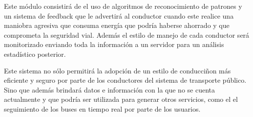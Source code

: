 Este módulo consistirá de el uso de algoritmos de reconocimiento de patrones y un sistema de feedback que le advertirá al conductor cuando este realice una maniobra agresiva que consuma energía que podría haberse ahorrado y que comprometa la seguridad vial. Además el estilo de manejo de cada conductor será monitorizado enviando toda la información a un servidor para un análisis estadístico posterior.

Este sistema no sólo permitirá la adopción de un estilo de conducciñon más eficiente y seguro por parte de los conductores del sistema de transporte público. Sino que además brindará datos e información con la que no se cuenta actualmente y que podría ser utilizada para generar otros servicios, como el el seguimiento de los buses en tiempo real por parte de los usuarios.
